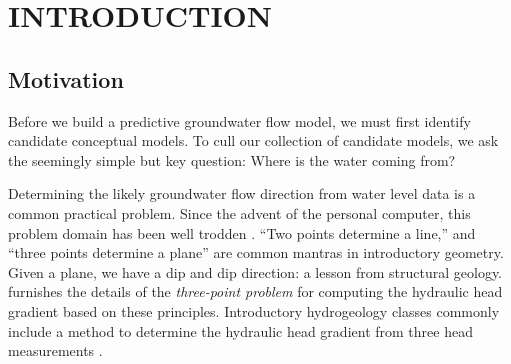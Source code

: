 \documentclass[12pt]{report}
\begin{document}
\renewcommand\contentsname{Table of Contents}   %
\tableofcontents


\listoftables


\listoffigures


\chapter{INTRODUCTION}\label{1.0.1}
\setcounter{page}{1}


\section{Motivation}
Before we build a predictive groundwater flow model, we must first identify candidate conceptual models. To cull our collection of candidate models, we ask the seemingly simple but key question: Where is the water coming from?

Determining the likely groundwater flow direction from water level data is a common practical problem. Since the advent of the personal computer, this problem domain has been well trodden \citep[e.g.][]{Kelly1989}. ``Two points determine a line,'' and ``three points determine a plane'' are common mantras in introductory geometry. Given a plane, we have a dip and dip direction: a lesson from structural geology. \citet{Pinder1981} furnishes the details of the {\em three-point problem} for computing the hydraulic head gradient based on these principles. Introductory hydrogeology classes commonly include a method to determine the hydraulic head gradient from three head measurements \citep[e.g.][Section 4.12]{Fetter94}.
\end{document}
